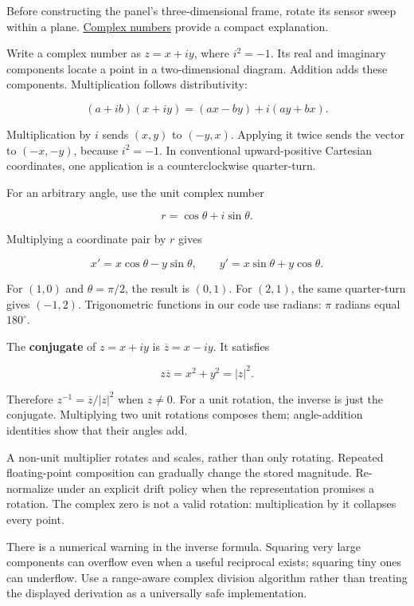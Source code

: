 \hypertarget{01-foundations-i-ch017-rotation-first-becomes-understandable-in-a-plane}{}

Before constructing the panel's three-dimensional frame, rotate its sensor sweep within a plane. \hyperref[01-foundations-i-ch017-rotation-first-becomes-understandable-in-a-plane]{Complex numbers} provide a compact explanation.

Write a complex number as \(z=x+iy\), where \(i^2=-1\). Its real and imaginary components locate a point in a two-dimensional diagram. Addition adds these components. Multiplication follows distributivity:

\[
(a+ib)(x+iy)=(ax-by)+i(ay+bx).
\]

Multiplication by \(i\) sends \((x,y)\) to \((-y,x)\). Applying it twice sends the vector to \((-x,-y)\), because \(i^2=-1\). In conventional upward-positive Cartesian coordinates, one application is a counterclockwise quarter-turn.

For an arbitrary angle, use the unit complex number

\[
r=\cos\theta+i\sin\theta.
\]

Multiplying a coordinate pair by \(r\) gives

\[
x'=x\cos\theta-y\sin\theta,\qquad
y'=x\sin\theta+y\cos\theta.
\]

For \((1,0)\) and \(\theta=\pi/2\), the result is \((0,1)\). For \((2,1)\), the same quarter-turn gives \((-1,2)\). Trigonometric functions in our code use radians: \(\pi\) radians equal \(180^\circ\).

The \textbf{conjugate} of \(z=x+iy\) is \(\overline z=x-iy\). It satisfies

\[
z\overline z=x^2+y^2=|z|^2.
\]

Therefore \(z^{-1}=\overline z/|z|^2\) when \(z\ne0\). For a unit rotation, the inverse is just the conjugate. Multiplying two unit rotations composes them; angle-addition identities show that their angles add.

A non-unit multiplier rotates and scales, rather than only rotating. Repeated floating-point composition can gradually change the stored magnitude. Re-normalize under an explicit drift policy when the representation promises a rotation. The complex zero is not a valid rotation: multiplication by it collapses every point.

There is a numerical warning in the inverse formula. Squaring very large components can overflow even when a useful reciprocal exists; squaring tiny ones can underflow. Use a range-aware complex division algorithm rather than treating the displayed derivation as a universally safe implementation.

